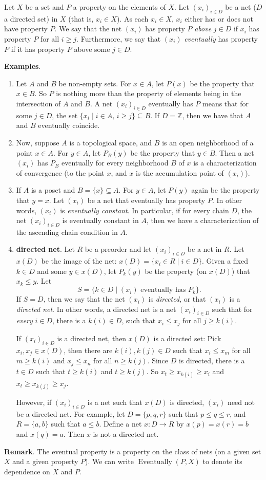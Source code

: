 \documentclass[12pt]{article}
\begin{document}
Let $X$ be a set and $P$ a property on the elements of $X$.  Let $(x_i)_{i\in D}$ be a net ($D$ a directed set) in $X$ (that is, $x_i\in X$).  As each $x_i\in X$, $x_i$ either has or does not have property $P$.  We say that the net $(x_i)$ has property $P$ \emph{above} $j\in D$ if $x_i$ has property $P$ for all $i\ge j$.  Furthermore, we say that $(x_i)$ \emph{eventually} has property $P$ if it has property $P$ above some $j\in D$.

\textbf{Examples}.
\begin{enumerate}
\item Let $A$ and $B$ be non-empty sets.  For $x\in A$, let $P(x)$ be the property that $x\in B$.  So $P$ is nothing more than the property of elements being in the intersection of $A$ and $B$.  A net $(x_i)_{i\in D}$ eventually has $P$ means that for some $j\in D$, the set $\lbrace x_i\mid i\in A\mbox{, } i\ge j \rbrace \subseteq B$.  If $D=\mathbb{Z}$, then we have that $A$ and $B$ eventually coincide.  
\item Now, suppose $A$ is a topological space, and $B$ is an open neighborhood of a point $x\in A$.  For $y\in A$, let $P_B(y)$ be the property that $y\in B$.  Then a net $(x_i)$ has $P_B$ eventually for every neighborhood $B$ of $x$ is a characterization of convergence (to the point $x$, and $x$ is the accumulation point of $(x_i)$).
\item If $A$ is a poset and $B=\lbrace x\rbrace \subseteq A$.  For $y\in A$, let $P(y)$ again be the property that $y=x$.  Let $(x_i)$ be a net that eventually has property $P$.  In other words, $(x_i)$ is \emph{eventually constant}.  In particular, if for every chain $D$, the net $(x_i)_{i\in D}$ is eventually constant in $A$, then we have a characterization of the ascending chain condition in $A$.
\item \textbf{directed net}.  Let $R$ be a preorder and let $(x_i)_{i\in D}$ be a net in $R$.  Let $x(D)$ be the image of the net: $x(D)=\lbrace x_i\in R \mid i\in D\rbrace$.  Given a fixed $k\in D$ and some $y\in x(D)$, let $P_k(y)$ be the property (on $x(D)$) that $x_k\le y$.  Let $$S=\lbrace k \in D \mid (x_i)\mbox{ eventually has }P_k\rbrace.$$  If $S=D$, then we say that the net $(x_i)$ is \emph{directed}, or that $(x_i)$ is a \emph{directed net}.  In other words, a directed net is a net $(x_i)_{i\in D}$ such that for \emph{every} $i\in D$, there is a $k(i)\in D$, such that $x_i\le x_j$ for all $j\ge k(i)$.

If $(x_i)_{i\in D}$ is a directed net, then $x(D)$ is a directed set:  Pick $x_i,x_j\in x(D)$, then there are $k(i),k(j)\in D$ such that $x_i\le x_m$ for all $m\ge k(i)$ and $x_j\le x_n$ for all $n\ge k(j)$.  Since $D$ is directed, there is a $t\in D$ such that $t\ge k(i)$ and $t\ge k(j)$.  So $x_t\ge x_{k(i)}\ge x_i$ and $x_t\ge x_{k(j)}\ge x_j$.

However, if $(x_i)_{i\in D}$ is a net such that $x(D)$ is directed, $(x_i)$ need not be a directed net.  For example, let $D=\lbrace p,q,r\rbrace$ such that $p\le q\le r$, and $R=\lbrace a,b\rbrace$ such that $a\le b$.  Define a net $x:D\to R$ by $x(p)=x(r)=b$ and $x(q)=a$.  Then $x$ is not a directed net.
\end{enumerate}

\textbf{Remark}.  The eventual property is a property on the class of nets (on a given set $X$ and a given property $P$).  We can write $\operatorname{Eventually}(P,X)$ to denote its dependence on $X$ and $P$.
\end{document}
